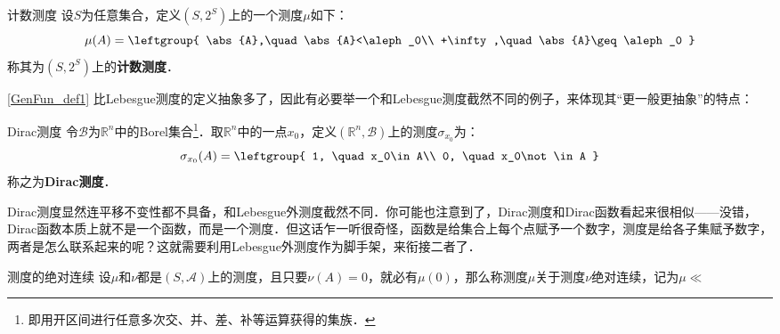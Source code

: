 \begin{example}{计数测度}
设$S$为任意集合，定义$(S, 2^S)$上的一个测度$\mu$如下：
\begin{equation}
\mu(A)=
\leftgroup{
    \abs{A},\quad \abs{A}<\aleph_0\\
    +\infty,\quad \abs{A}\geq\aleph_0
}
\end{equation}
称其为$(S, 2^S)$上的\textbf{计数测度}．
\end{example}

\autoref{GenFun_def1} 比Lebesgue测度的定义抽象多了，因此有必要举一个和Lebesgue测度截然不同的例子，来体现其“更一般更抽象”的特点：

\begin{example}{Dirac测度}
令$\mathcal{B}$为$\mathbb{R}^n$中的Borel集合\footnote{即用开区间进行任意多次交、并、差、补等运算获得的集族．}．取$\mathbb{R}^n$中的一点$x_0$，定义$(\mathbb{R}^n, \mathcal{B})$上的测度$\sigma_{x_0}$为：
\begin{equation}
\sigma_{x_0}(A)=\leftgroup{
    1, \quad x_0\in A\\
    0, \quad x_0\not\in A
}
\end{equation}
称之为\textbf{Dirac测度}．
\end{example}

Dirac测度显然连平移不变性都不具备，和Lebesgue外测度截然不同．你可能也注意到了，Dirac测度和Dirac函数看起来很相似——没错，Dirac函数本质上就不是一个函数，而是一个测度．但这话乍一听很奇怪，函数是给集合上每个点赋予一个数字，测度是给各子集赋予数字，两者是怎么联系起来的呢？这就需要利用Lebesgue外测度作为脚手架，来衔接二者了．

\begin{definition}{测度的绝对连续}
设$\mu$和$\nu$都是$(S, \mathcal{A})$上的测度，且只要$\nu(A)=0$，就必有$\mu(0)$，那么称测度$\mu$关于测度$\nu$绝对连续，记为$\mu\ll$
\end{definition}




















